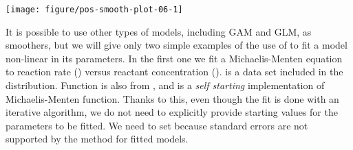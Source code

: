 \documentclass[krantz2]{krantz}\usepackage{knitr}%
\begin{document}
\begin{knitrout}\footnotesize
{}\color{fgcolor}\begin{kframe}
\begin{alltt}
\hlstd{(}  \hlstd{(}     \hlstd{=}  \hlopt{+}
  \hlstd{(} \hlstd{=} \hlstd{,}   \hlopt{~}  \hlstd{),}  \hlstd{=} \hlstd{)} \hlopt{+}
  \hlstd{()}
\end{alltt}
\end{kframe}

{\centering \texttt{[image: figure/pos-smooth-plot-06-1]} 

}



\end{knitrout}

It is possible to use other types of models, including GAM and GLM, as smoothers, but we will give only two simple examples of the use of  to fit a model non-linear in its parameters. In the first one we fit a Michaelis-Menten equation to reaction rate () versus reactant concentration ().  is a data set included in the \Rlang distribution. Function  is also from \Rlang, and is a \emph{self starting} implementation of Michaelis-Menten function. Thanks to this, even though the fit is done with an iterative algorithm, we do not need to explicitly provide starting values for the parameters to be fitted. We need to set  because standard errors are not supported by the  method for  fitted models.

\begin{knitrout}\footnotesize
{}\color{fgcolor}\begin{kframe}
\begin{alltt}
    \hlopt{+}
  \hlstd{()} \hlopt{+}
  \hlstd{(} \hlstd{=} \hlstd{,}
                \hlopt{~} 
               \hlstd{=} \hlstd{)}
\end{alltt}
\end{kframe}
\end{knitrout}
\end{document}
